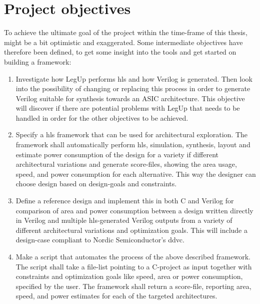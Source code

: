 \section{Project objectives}
To achieve the ultimate goal of the project within the time-frame of this thesis, might be a bit optimistic and exaggerated. Some intermediate objectives have therefore been defined, to get some insight into the tools and get started on building a framework:
\begin{enumerate}
    \item Investigate how LegUp performs \gls{hls} and how Verilog is generated. Then look into the possibility of changing or replacing this process in order to generate Verilog suitable for synthesis towards an ASIC architecture. This objective will discover if there are potential problems with LegUp that needs to be handled in order for the other objectives to be achieved.
    \item Specify a \gls{hls} framework that can be used for architectural exploration. The framework shall automatically perform \gls{hls}, simulation, synthesis, layout and estimate power consumption of the design for a variety if different architectural variations and generate score-files, showing the area usage, speed, and power consumption for each alternative. This way the designer can choose design based on design-goals and constraints.
    \item Define a reference design and implement this in both C and Verilog for comparison of area and power consumption between a design written directly in Verilog and multiple \gls{hls}-generated Verilog outputs from a variety of different architectural variations and optimization goals. This will include a design-case compliant to Nordic Semiconductor's \gls{ddvc}.
    \item Make a script that automates the process of the above described framework. The script shall take a file-list pointing to a C-project as input together with constraints and optimization goals like speed, area or power consumption, specified by the user. The framework shall return a score-file, reporting area, speed, and power estimates for each of the targeted architectures.
\end{enumerate}

